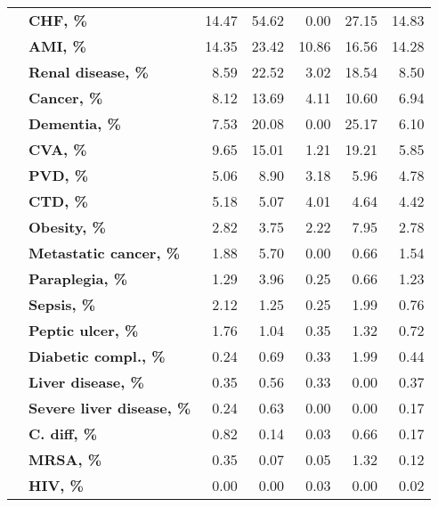\begin{tabular}{llrrrrr}
               & \textbf{CHF, \%} &    14.47 &    54.62 &     0.00 &     27.15 &             14.83 \\
               & \textbf{AMI, \%} &    14.35 &    23.42 &    10.86 &     16.56 &             14.28 \\
               & \textbf{Renal disease, \%} &     8.59 &    22.52 &     3.02 &     18.54 &              8.50 \\
               & \textbf{Cancer, \%} &     8.12 &    13.69 &     4.11 &     10.60 &              6.94 \\
               & \textbf{Dementia, \%} &     7.53 &    20.08 &     0.00 &     25.17 &              6.10 \\
               & \textbf{CVA, \%} &     9.65 &    15.01 &     1.21 &     19.21 &              5.85 \\
               & \textbf{PVD, \%} &     5.06 &     8.90 &     3.18 &      5.96 &              4.78 \\
               & \textbf{CTD, \%} &     5.18 &     5.07 &     4.01 &      4.64 &              4.42 \\
               & \textbf{Obesity, \%} &     2.82 &     3.75 &     2.22 &      7.95 &              2.78 \\
               & \textbf{Metastatic cancer, \%} &     1.88 &     5.70 &     0.00 &      0.66 &              1.54 \\
               & \textbf{Paraplegia, \%} &     1.29 &     3.96 &     0.25 &      0.66 &              1.23 \\
               & \textbf{Sepsis, \%} &     2.12 &     1.25 &     0.25 &      1.99 &              0.76 \\
               & \textbf{Peptic ulcer, \%} &     1.76 &     1.04 &     0.35 &      1.32 &              0.72 \\
               & \textbf{Diabetic compl., \%} &     0.24 &     0.69 &     0.33 &      1.99 &              0.44 \\
               & \textbf{Liver disease, \%} &     0.35 &     0.56 &     0.33 &      0.00 &              0.37 \\
               & \textbf{Severe liver disease, \%} &     0.24 &     0.63 &     0.00 &      0.00 &              0.17 \\
               & \textbf{C. diff, \%} &     0.82 &     0.14 &     0.03 &      0.66 &              0.17 \\
               & \textbf{MRSA, \%} &     0.35 &     0.07 &     0.05 &      1.32 &              0.12 \\
               & \textbf{HIV, \%} &     0.00 &     0.00 &     0.03 &      0.00 &              0.02 \\
\bottomrule
\end{tabular}
